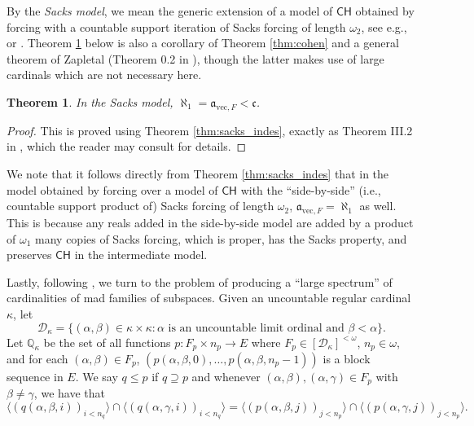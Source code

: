 \documentclass[11pt]{amsart}
\newcommand{\Q}{\mathbb{Q}}
\newcommand{\LD}{\mathcal{D}}
\renewcommand{\a}{\mathfrak{a}}
\renewcommand{\c}{\mathfrak{c}}
\newtheorem{thm}{Theorem}[section]
\theoremstyle{definition}
\theoremstyle{remark}
\newcommand{\cf}{\mathrm{cf}}
\newcommand{\CH}{\mathsf{CH}}
\renewcommand{\1}{\mathbf{1}}
\begin{document}
By the \emph{Sacks model}, we mean the generic extension of a model of $\CH$ obtained by forcing with a countable support iteration of Sacks forcing of length $\omega_2$, see e.g., \cite{MR556894} or \cite{MR1900391}. Theorem \ref{thm:sacks} below is also a corollary of Theorem \ref{thm:cohen} and a general theorem of Zapletal (Theorem 0.2 in \cite{MR1978947}), though the latter makes use of large cardinals which are not necessary here.

\begin{thm}\label{thm:sacks}
	In the Sacks model, $\aleph_1=\a_{\mathrm{vec},F}<\c$.	
\end{thm}

\begin{proof}
	This is proved using Theorem \ref{thm:sacks_indes}, exactly as Theorem III.2 in \cite{MR1900391}, which the reader may consult for details.
\end{proof}

We note that it follows directly from Theorem \ref{thm:sacks_indes} that in the model obtained by forcing over a model of $\CH$ with the ``side-by-side''  (i.e., countable support product of) Sacks forcing \cite{MR794485} of length $\omega_2$, $\a_{\mathrm{vec},F}=\aleph_1$ as well. This is because any reals added in the side-by-side model are added by a product of $\omega_1$ many copies of Sacks forcing, which is proper, has the Sacks property, and preserves $\CH$ in the intermediate model.


Lastly, following \cite{MR0307913}, we turn to the problem of producing a ``large spectrum'' of cardinalities of mad families of subspaces. Given an uncountable regular cardinal $\kappa$, let
\[
	\LD_\kappa = \{(\alpha,\beta)\in\kappa\times\kappa:\alpha\text{ is an uncountable limit ordinal and }\beta<\alpha\}.
\]
Let $\Q_\kappa$ be the set of all functions $p:F_p\times n_p\to E$ where $F_p\in[\LD_\kappa]^{<\omega}$, $n_p\in\omega$, and for each $(\alpha,\beta)\in F_p$, $(p(\alpha,\beta,0),\ldots,p(\alpha,\beta,n_p-1))$ is a block sequence in $E$. We say $q\leq p$ if $q\supseteq p$ and whenever $(\alpha,\beta),(\alpha,\gamma)\in F_p$ with $\beta\neq\gamma$, we have that
\[
	\langle(q(\alpha,\beta,i))_{i<n_q}\rangle\cap\langle(q(\alpha,\gamma,i))_{i<n_q}\rangle=\langle(p(\alpha,\beta,j))_{j<n_p}\rangle\cap\langle(p(\alpha,\gamma,j))_{j<n_p}\rangle.
\]
\end{document}
